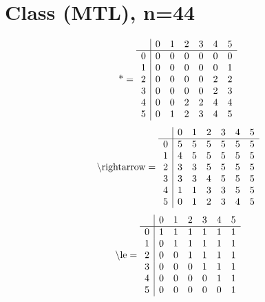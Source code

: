 \documentclass[11pt]{article}
\begin{document}
\section{Class (MTL), n=44}
\[\text{*} = 
\begin{array}{r | r r r r r r}
 & 0 & 1 & 2 & 3 & 4 & 5 \\ \hline
0 & 0 & 0 & 0 & 0 & 0 & 0 \\
1 & 0 & 0 & 0 & 0 & 0 & 1 \\
2 & 0 & 0 & 0 & 0 & 2 & 2 \\
3 & 0 & 0 & 0 & 0 & 2 & 3 \\
4 & 0 & 0 & 2 & 2 & 4 & 4 \\
5 & 0 & 1 & 2 & 3 & 4 & 5 \\
\end{array}
\]
\[\text{\textbackslash rightarrow} = 
\begin{array}{r | r r r r r r}
 & 0 & 1 & 2 & 3 & 4 & 5 \\ \hline
0 & 5 & 5 & 5 & 5 & 5 & 5 \\
1 & 4 & 5 & 5 & 5 & 5 & 5 \\
2 & 3 & 3 & 5 & 5 & 5 & 5 \\
3 & 3 & 3 & 4 & 5 & 5 & 5 \\
4 & 1 & 1 & 3 & 3 & 5 & 5 \\
5 & 0 & 1 & 2 & 3 & 4 & 5 \\
\end{array}
\]
\[\text{\textbackslash le} = 
\begin{array}{r | r r r r r r}
 & 0 & 1 & 2 & 3 & 4 & 5 \\ \hline
0 & 1 & 1 & 1 & 1 & 1 & 1 \\
1 & 0 & 1 & 1 & 1 & 1 & 1 \\
2 & 0 & 0 & 1 & 1 & 1 & 1 \\
3 & 0 & 0 & 0 & 1 & 1 & 1 \\
4 & 0 & 0 & 0 & 0 & 1 & 1 \\
5 & 0 & 0 & 0 & 0 & 0 & 1 \\
\end{array}
\]
\end{document}

